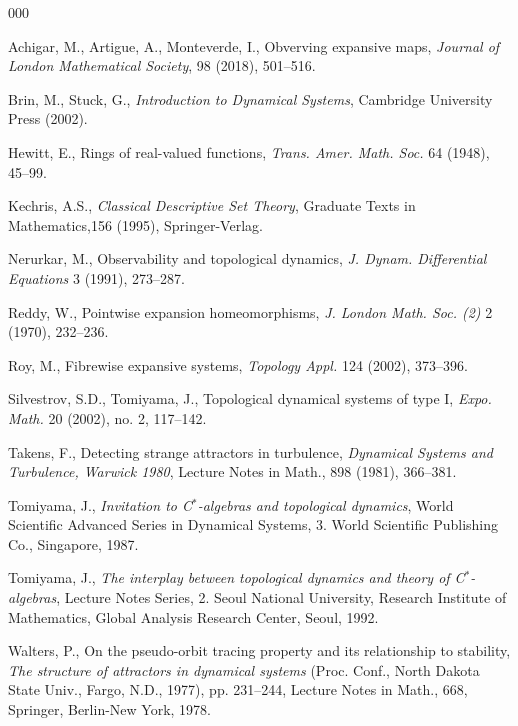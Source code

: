 \documentclass[11pt,letterpaper]{amsart}
\begin{document}
\begin{thebibliography}{000}


Achigar, M., Artigue, A., Monteverde, I.,
Obverving expansive maps,
{\em Journal of London Mathematical Society}, 98 (2018), 501--516.

Brin, M., Stuck, G.,
{\em Introduction to Dynamical Systems},
Cambridge University Press (2002).











Hewitt, E.,
Rings of real-valued functions,
{\em Trans. Amer. Math. Soc.} 64 (1948), 45--99.



Kechris, A.S.,
{\em Classical Descriptive Set Theory},
Graduate Texts in Mathematics,156 (1995), Springer-Verlag.




Nerurkar, M.,
Observability and topological dynamics, 
{\em J. Dynam. Differential Equations} 3 (1991), 273--287.



Reddy, W.,
Pointwise expansion homeomorphisms,
{\em J. London Math. Soc. (2)} 2 (1970), 232--236.



Roy, M.,
Fibrewise expansive systems,
{\em Topology Appl.} 124 (2002), 373--396.



Silvestrov, S.D., Tomiyama, J.,
Topological dynamical systems of type I,
{\em Expo. Math.} 20 (2002), no. 2, 117--142.

Takens, F.,
Detecting strange attractors in turbulence,
{\em Dynamical Systems and Turbulence, Warwick 1980},
Lecture Notes in Math., 898 (1981), 366--381.


Tomiyama, J.,
{\em Invitation to C$^*$-algebras and topological dynamics},
World Scientific Advanced Series in Dynamical Systems, 3. World Scientific Publishing Co., Singapore, 1987.


Tomiyama, J.,
{\em The interplay between topological dynamics and theory of C$^*$-algebras},
Lecture Notes Series, 2. Seoul National University, Research Institute of Mathematics, Global Analysis Research Center, Seoul, 1992.





Walters, P.,
On the pseudo-orbit tracing property and its relationship to stability,
{\em The structure of attractors in dynamical systems} (Proc. Conf., North Dakota State Univ., Fargo, N.D., 1977), pp. 231--244,
Lecture Notes in Math., 668, Springer, Berlin-New York, 1978.











\end{thebibliography}
\end{document}
